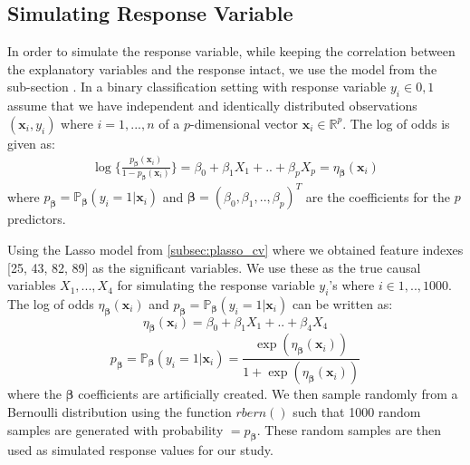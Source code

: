 \subsection{Simulating Response Variable} \label{subsubsec:simresponse}
In order to simulate the response variable, while keeping the correlation between the explanatory variables and the response intact, we use the model from the sub-section . In a binary classification setting with response variable $y_i \in{0,1}$ assume that we have independent and identically distributed observations $(\mathbf{x}_i, y_i)$ where $i=1, . . . , n$ of a $p$-dimensional vector $\mathbf{x}_i \in \mathbb{R}^p$. The log of odds is given as:
\begin{equation*}
\begin{split}
\log\{\frac{p_{\pmb{\beta}}(\mathbf{x}_i)}{1-p_{\pmb{\beta}}(\mathbf{x}_i)}\}=\beta_0+\beta_1X_1+..+\beta_pX_p=\eta_{\pmb{\beta}}(\mathbf{x}_i)
\end{split}
\end{equation*}
where $p_{\pmb{\beta}} = \mathbb{P}_{\pmb{\beta}}(y_i=1|\mathbf{x}_i)$ and $\pmb{\beta}=(\beta_0,\beta_1, .., \beta_p)^T$ are the coefficients for the $p$ predictors.\par
Using the Lasso model from \autoref{subsec:plasso_cv} where we obtained feature indexes [25, 43, 82, 89] as the significant variables. We use these as the true causal variables $X_1,...,X_4$ for simulating the response variable $y_i$'s where $i\in 1,..,1000$. The log of odds $\eta_{\pmb{\beta}}(\mathbf{x}_i)$ and $p_{\pmb{\beta}}=\mathbb{P}_{\pmb{\beta}}(y_i=1|\mathbf{x}_i)$ can be written as:
\begin{equation}\label{eq:9}
\eta_{\pmb{\beta}}(\mathbf{x}_i)=\beta_0+\beta_1X_1+..+\beta_4X_4
\end{equation}
\begin{equation}\label{eq:10}
p_{\pmb{\beta}} = \mathbb{P}_{\pmb{\beta}}(y_i=1|\mathbf{x}_i) =  \frac{\exp(\eta_{\pmb{\beta}}(\mathbf{x}_i))}{1+\exp(\eta_{\pmb{\beta}}(\mathbf{x}_i))}
\end{equation}
where the $\pmb{\beta}$ coefficients are artificially created. We then sample randomly from a Bernoulli distribution using the function $rbern()$ such that 1000 random samples are generated with probability $=p_{\pmb{\beta}}$. These random samples are then used as simulated response values for our study.\par


